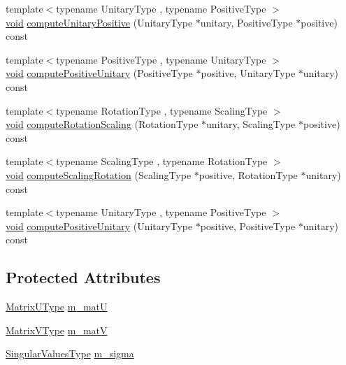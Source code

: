 \begin{DoxyCompactItemize}
\item 
{\footnotesize template$<$typename Unitary\-Type , typename Positive\-Type $>$ }\\\hyperlink{group___u_a_v_objects_plugin_ga444cf2ff3f0ecbe028adce838d373f5c}{void} \hyperlink{class_s_v_d_a6de39940fcb923fa912e9a8e2ce0febd}{compute\-Unitary\-Positive} (Unitary\-Type $\ast$unitary, Positive\-Type $\ast$positive) const 
\item 
{\footnotesize template$<$typename Positive\-Type , typename Unitary\-Type $>$ }\\\hyperlink{group___u_a_v_objects_plugin_ga444cf2ff3f0ecbe028adce838d373f5c}{void} \hyperlink{class_s_v_d_a9d37e2bd3862059148c1fc561d47292f}{compute\-Positive\-Unitary} (Positive\-Type $\ast$positive, Unitary\-Type $\ast$unitary) const 
\item 
{\footnotesize template$<$typename Rotation\-Type , typename Scaling\-Type $>$ }\\\hyperlink{group___u_a_v_objects_plugin_ga444cf2ff3f0ecbe028adce838d373f5c}{void} \hyperlink{class_s_v_d_af7fa655eee8053d86e01b72972f88a20}{compute\-Rotation\-Scaling} (Rotation\-Type $\ast$unitary, Scaling\-Type $\ast$positive) const 
\item 
{\footnotesize template$<$typename Scaling\-Type , typename Rotation\-Type $>$ }\\\hyperlink{group___u_a_v_objects_plugin_ga444cf2ff3f0ecbe028adce838d373f5c}{void} \hyperlink{class_s_v_d_a73410ded701952f03dfb076154655152}{compute\-Scaling\-Rotation} (Scaling\-Type $\ast$positive, Rotation\-Type $\ast$unitary) const 
\item 
{\footnotesize template$<$typename Unitary\-Type , typename Positive\-Type $>$ }\\\hyperlink{group___u_a_v_objects_plugin_ga444cf2ff3f0ecbe028adce838d373f5c}{void} \hyperlink{class_s_v_d_a61c7a92fd3c8bc330ddbe3ffb6e0f57f}{compute\-Positive\-Unitary} (Unitary\-Type $\ast$positive, Positive\-Type $\ast$unitary) const 
\end{DoxyCompactItemize}
\subsection*{Protected Attributes}
\begin{DoxyCompactItemize}
\item 
\hyperlink{class_matrix}{Matrix\-U\-Type} \hyperlink{class_s_v_d_a4bdba0c2adff87334ba0055427798028}{m\-\_\-mat\-U}
\item 
\hyperlink{class_matrix}{Matrix\-V\-Type} \hyperlink{class_s_v_d_aa3529e82390bb6ccc0b0036426df5c99}{m\-\_\-mat\-V}
\item 
\hyperlink{class_matrix}{Singular\-Values\-Type} \hyperlink{class_s_v_d_a308e3c09ad05420e5b2d97a654060106}{m\-\_\-sigma}
\end{DoxyCompactItemize}


